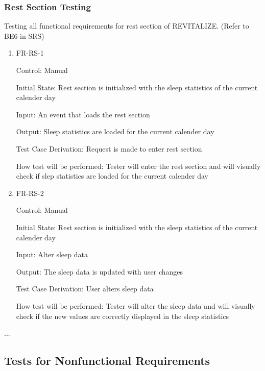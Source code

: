 \documentclass[12pt, titlepage]{article}
\begin{document}
\subsubsection{Rest Section Testing}

Testing all functional requirements for rest section of REVITALIZE. (Refer to BE6 in SRS)

\begin{enumerate}
	
	\item{FR-RS-1\\}
	
	Control: Manual
	
	Initial State: Rest section is initialized with the sleep statistics of the current calender day
	
	Input: An event that loads the rest section
	
	Output: Sleep statistics are loaded for the current calender day
	
	Test Case Derivation: Request is made to enter rest section
	
	How test will be performed: Tester will enter the rest section and will visually check if slep statistics are loaded for the current calender day
	
	\item{FR-RS-2 \\}
	
	Control: Manual
	
	Initial State: Rest section is initialized with the sleep statistics of the current calender day
	
	Input: Alter sleep data
	
	Output: The sleep data is updated with user changes
	
	Test Case Derivation: User alters sleep data
	
	How test will be performed: Tester will alter the sleep data and will visually check if the new values are correctly displayed in the sleep statistics
	
\end{enumerate}
...

\subsection{Tests for Nonfunctional Requirements}

\end{document}
